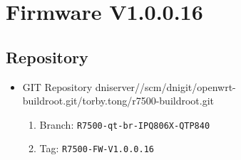 \documentclass[12pt]{report}
\newcommand{\tlabel}[1]{
  \label{#1}%
  }
\begin{document}
\section{Firmware V1.0.0.16}

\tlabel{sec:1-0-1}
\subsection{Repository}
\begin{itemize}
	\item GIT Repository dniserver//scm/dnigit/openwrt-buildroot.git/torby.tong/r7500-buildroot.git
	\begin{enumerate}
		\item Branch: \texttt{R7500-qt-br-IPQ806X-QTP840}
                \item Tag: \texttt{R7500-FW-V1.0.0.16}
	\end{enumerate}
\end{itemize}
\end{document}
